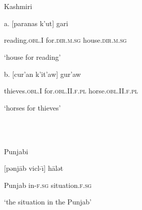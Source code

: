 \documentclass[output=paper]{langsci/langscibook}
\begin{document}
\begin{styleSfondomedioiColorexi}
\ea%
    \label{ex:key:49}
    \gll\\
        \\
    \glt
    \z

          Kashmiri \citep[293]{Payne1995}
\end{styleSfondomedioiColorexi}

\begin{styleSfondomedioiColorexi}
a.   [paranas     k'ut]     gari 
\end{styleSfondomedioiColorexi}

\begin{styleSfondomedioiColorexi}
reading.\textsc{obl}.I   for.\textsc{dir.m.sg}  house.\textsc{dir.m.sg}
\end{styleSfondomedioiColorexi}

\begin{styleSfondomedioiColorexi}
‘house for reading’  
\end{styleSfondomedioiColorexi}

\begin{styleSfondomedioiColorexi}
b.   [cur'an     k'it'aw]     gur'aw
\end{styleSfondomedioiColorexi}

\begin{styleSfondomedioiColorexi}
thieves.\textsc{obl}.I   for.\textsc{obl}.II.\textsc{f.pl}   horse.\textsc{obl.II.f.pl}
\end{styleSfondomedioiColorexi}

\begin{styleSfondomedioiColorexi}
‘horses for thieves’    
\end{styleSfondomedioiColorexi}

\ea%
    \label{ex:key:50}
    \gll\\
        \\
    \glt
    \z

           Punjabi \citep[289]{Payne1995}

[pənj\=ab  vicl-\=\i]    h\=alət        

Punjab   in-\textsc{f.sg}  situation.\textsc{f.sg}

‘the situation in the Punjab’ 
\end{document}
